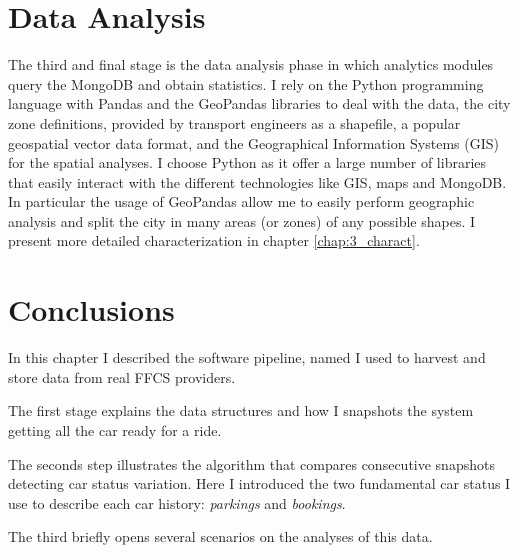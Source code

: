 


\section{Data Analysis}
The third and final stage is the data analysis phase in which analytics modules query the MongoDB and obtain statistics. I rely on the Python programming language with Pandas and the GeoPandas libraries to deal with the data, the city zone definitions, provided by transport engineers as a shapefile, a popular geospatial vector data format, and the Geographical Information Systems (GIS) for the spatial analyses. I choose Python as it offer a large number of  libraries that easily interact with the different technologies like GIS, maps and MongoDB. In particular the usage of GeoPandas allow me to easily perform geographic analysis and split the city in many areas (or zones) of any possible shapes. I present more detailed characterization in chapter \ref{chap:3_charact}.


\section{Conclusions}
In this chapter I described the software pipeline, named \tool I used to harvest and store data from real FFCS providers. 

The first stage explains the data structures and how I snapshots the system getting all the car ready for a ride. 

The seconds step illustrates the algorithm that compares consecutive snapshots detecting car status variation. Here I introduced the two fundamental car status I use to describe each car history: \textit{parkings} and \textit{bookings}. 

The third briefly opens several scenarios on the analyses of this data.


